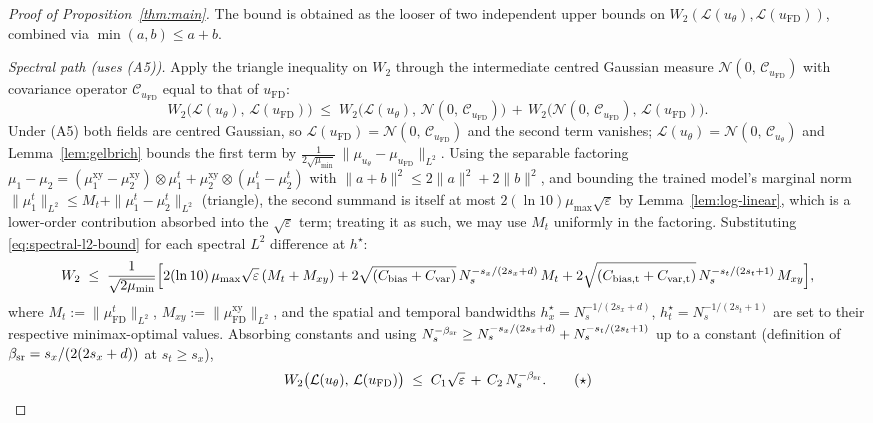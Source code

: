 \documentclass[review,12pt]{elsarticle}
\begin{document}
\begin{proof}[Proof of Proposition~\ref{thm:main}]
The bound is obtained as the looser of two independent upper bounds
on \(W_2(\mathcal L(u_\theta),\mathcal L(u_{\mathrm{FD}}))\), combined
via \(\min(a,b)\le a+b\).

\smallskip
\emph{Spectral path (uses (A5)).} Apply the triangle inequality on
\(W_2\) through the intermediate centred Gaussian measure
\(\mathcal N(0,\,\mathcal C_{u_{\mathrm{FD}}})\) with covariance
operator \(\mathcal C_{u_{\mathrm{FD}}}\) equal to that of
\(u_{\mathrm{FD}}\):
\[
W_2\bigl(\mathcal L(u_\theta),\,\mathcal L(u_{\mathrm{FD}})\bigr)
\;\le\;
W_2\bigl(\mathcal L(u_\theta),\,
\mathcal N(0,\,\mathcal C_{u_{\mathrm{FD}}})\bigr)
\,+\,
W_2\bigl(\mathcal N(0,\,\mathcal C_{u_{\mathrm{FD}}}),\,
\mathcal L(u_{\mathrm{FD}})\bigr).
\]
Under (A5) both fields are centred Gaussian, so
\(\mathcal L(u_{\mathrm{FD}}) = \mathcal N(0,\,\mathcal C_{u_{\mathrm{FD}}})\)
and the second term vanishes;
\(\mathcal L(u_\theta) = \mathcal N(0,\,\mathcal C_{u_\theta})\) and
Lemma~\ref{lem:gelbrich} bounds the first term by
\(\tfrac{1}{2\sqrt{\mu_{\min}}}\,\|\mu_{u_\theta}
- \mu_{u_{\mathrm{FD}}}\|_{L^2}\). Using the separable factoring
\(\mu_1 - \mu_2 = (\mu^{\mathrm{xy}}_1 - \mu^{\mathrm{xy}}_2)
\otimes \mu^t_1
+ \mu^{\mathrm{xy}}_2 \otimes (\mu^t_1 - \mu^t_2)\) with
\(\|a+b\|^2 \le 2\|a\|^2 + 2\|b\|^2\), and bounding the trained
model's marginal norm $\|\mu^t_1\|_{L^2} \le M_t + \|\mu^t_1 -
\mu^t_2\|_{L^2}$ (triangle), the second summand is itself at most
$2(\ln 10)\mu_{\max}\sqrt\varepsilon$ by
Lemma~\ref{lem:log-linear}, which is a lower-order contribution
absorbed into the $\sqrt\varepsilon$ term; treating it as such, we
may use $M_t$ uniformly in the factoring. Substituting
\eqref{eq:spectral-l2-bound} for each spectral $L^2$ difference at
$h^\star$:
\[
W_2 \;\le\;
\frac{1}{\sqrt{2\mu_{\min}}}\Bigl[
2(\ln 10)\,\mu_{\max}\sqrt\varepsilon\,(M_t + M_{xy})
+ 2\sqrt{(C_{\rm bias}+C_{\rm var})}\,N_s^{-s_x/(2 s_x + d)}\,M_t
+ 2\sqrt{(C_{\rm bias,t}+C_{\rm var,t})}\,N_s^{-s_t/(2 s_t + 1)}\,M_{xy}
\Bigr],
\]
where \(M_t := \|\mu^t_{\mathrm{FD}}\|_{L^2}\),
\(M_{xy} := \|\mu^{\mathrm{xy}}_{\mathrm{FD}}\|_{L^2}\), and the
spatial and temporal bandwidths $h^\star_x = N_s^{-1/(2s_x+d)}$,
$h^\star_t = N_s^{-1/(2s_t+1)}$ are set to their respective
minimax-optimal values. Absorbing constants and using
\(N_s^{-\beta_{\rm sr}} \ge N_s^{-s_x/(2 s_x + d)}
+ N_s^{-s_t/(2 s_t + 1)}\) up to a constant
(definition of $\beta_{\rm sr} = s_x/(2(2s_x+d))$ at $s_t \ge s_x$),
\[
W_2\bigl(\mathcal L(u_\theta),\,\mathcal L(u_{\mathrm{FD}})\bigr)
\;\le\; C_1\sqrt\varepsilon \,+\, C_2\,N_s^{-\beta_{\rm sr}}.
\tag{$\star$}\label{eq:spectral-path}
\]


\end{proof}
\end{document}
